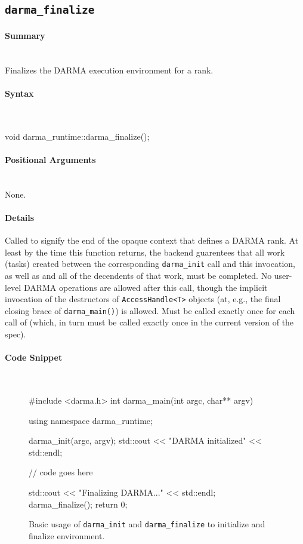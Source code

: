 
\subsection{\texttt{darma\_finalize}}
\label{ssec:api_fe_finalize}

\paragraph{Summary}\mbox{}\\
Finalizes the DARMA execution environment for a rank.

\paragraph{Syntax}\mbox{}\\ 
\begin{CppCode}
void darma_runtime::darma_finalize();
\end{CppCode}

\paragraph{Positional Arguments}\mbox{} \\
None. 

\paragraph{Details}\mbox{} 
Called to signify the end of the opaque context that defines a DARMA rank.  At
least by the time this function returns, the backend guarentees that all work
(tasks) created between the corresponding \texttt{darma\_init} call and this
invocation, as well as and all of the decendents of that work, must be
completed.  No user-level DARMA operations are allowed after this call, though
the implicit invocation of the destructors of \texttt{AccessHandle<T>} objects
(at, e.g., the final closing brace of \texttt{darma\_main()}) is allowed.  Must
be called exactly once for each call of  (which, in turn must
be called exactly once in the current version of the spec).

\paragraph{Code Snippet}\mbox{} \\
\begin{figure}[!h]
\begin{CppCodeNumb}
#include <darma.h>
int darma_main(int argc, char** argv)
{
  using namespace darma_runtime;

  darma_init(argc, argv);
  std::cout << "DARMA initialized" << std::endl;

  // code goes here

  std::cout << "Finalizing DARMA..." << std::endl;
  darma_finalize();
  return 0;
}
\end{CppCodeNumb}
\caption{Basic usage of \texttt{darma\_init} and \texttt{darma\_finalize} 
to initialize and finalize environment.}
\label{fig:fe_api_init}
\end{figure}

